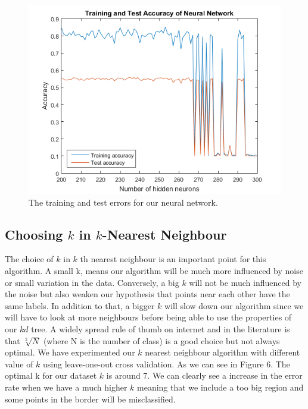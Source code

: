 \documentclass{article} %
\begin{document}
\begin{figure}
\centering
\includegraphics[scale=0.65]{fig1.png}
\caption{The training and test errors for our neural network.}
\end{figure}

\subsection{Choosing $k$ in $k$-Nearest Neighbour}

The choice of $k$ in $k$ th nearest neighbour is an important point for this algorithm. A small k, means our algorithm will be much more influenced by noise or small variation in the data. Conversely, a big $k$ will not be much influenced by the noise but also weaken our hypothesis that points near each other have the same labels. In addition to that, a bigger $k$ will slow down our algorithm since we will have to look at more neighbours before being able to use the properties of our $kd$ tree. A widely spread rule of thumb on internet and in the literature is that  $\sqrt[2]{N}$ (where N is the number of class) is a good choice but not always optimal. 
We have experimented our $k$ nearest neighbour algorithm with different value of $k$ using leave-one-out cross validation. As we can see in Figure 6. The optimal k for our dataset $k$ is around 7. 
We can clearly see a increase in the error rate when we have a much higher $k$ meaning that we include a too big region and some points in the border will be misclassified. 
\end{document}
